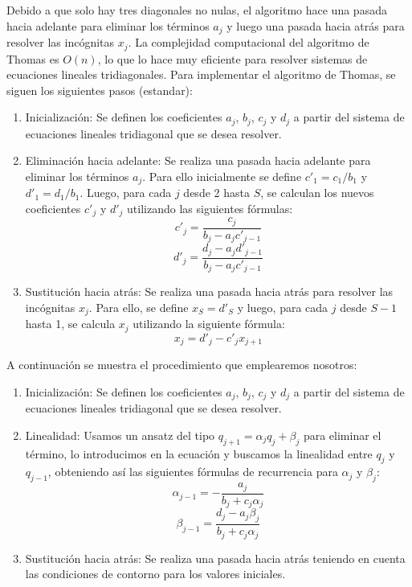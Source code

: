 \documentclass[10pt,onecolumn]{article}
\begin{document}
Debido a que solo hay tres diagonales no nulas, el algoritmo hace una pasada hacia adelante para eliminar los términos $a_j$ y luego una pasada hacia atrás para resolver las incógnitas $x_j$. La complejidad computacional del algoritmo de Thomas es $O(n)$, lo que lo hace muy eficiente para resolver sistemas de ecuaciones lineales tridiagonales. Para implementar el algoritmo de Thomas, se siguen los siguientes pasos (estandar):
\begin{enumerate}
    \item Inicialización: Se definen los coeficientes $a_j$, $b_j$, $c_j$ y $d_j$ a partir del sistema de ecuaciones lineales tridiagonal que se desea resolver.
    \item Eliminación hacia adelante: Se realiza una pasada hacia adelante para eliminar los términos $a_j$. Para ello inicialmente se define $c'_1 = c_1 / b_1$ y $d'_1 = d_1 / b_1$. Luego, para cada $j$ desde 2 hasta $S$, se calculan los nuevos coeficientes $c'_j$ y $d'_j$ utilizando las siguientes fórmulas:
    \begin{equation}
        c'_j = \dfrac{c_j}{b_j - a_j c'_{j-1}}
    \end{equation}
    \begin{equation}        d'_j = \dfrac{d_j - a_j d'_{j-1}}{b_j - a_j c'_{j-1}}
    \end{equation}
    \item Sustitución hacia atrás: Se realiza una pasada hacia atrás para resolver las incógnitas $x_j$. Para ello, se define $x_S = d'_S$ y luego, para cada $j$ desde $S-1$ hasta 1, se calcula $x_j$ utilizando la siguiente fórmula:
    \begin{equation}        x_j = d'_j - c'_j x_{j+1}
    \end{equation}
\end{enumerate}



A continuación se muestra el procedimiento que emplearemos nosotros:

\begin{enumerate}
    \item Inicialización: Se definen los coeficientes $a_j$, $b_j$, $c_j$ y $d_j$ a partir del sistema de ecuaciones lineales tridiagonal que se desea resolver.
    \item Linealidad: Usamos un ansatz del tipo $q_{j+1} = \alpha_j q_j + \beta_j$ para eliminar el término, lo introducimos en la ecuación y buscamos la linealidad entre $q_j$ y $q_{j-1}$, obteniendo así las siguientes fórmulas de recurrencia para $\alpha_j$ y $\beta_j$:
    \begin{equation}
        \alpha_{j-1} = -\dfrac{a_j}{b_j + c_j \alpha_j}
    \end{equation}
    \begin{equation}        
        \beta_{j-1} = \dfrac{d_j - a_j \beta_{j}}{b_j + c_j \alpha_j}
    \end{equation}
    \item Sustitución hacia atrás: Se realiza una pasada hacia atrás teniendo en cuenta las condiciones de contorno para los valores iniciales.
\end{enumerate}
\end{document}

